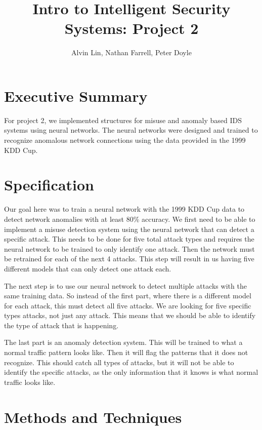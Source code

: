 \documentclass[letterpaper,12pt]{article}
\title{Intro to Intelligent Security Systems: Project 2}
\author{Alvin Lin, Nathan Farrell, Peter Doyle}
\begin{document}
\lstset{basicstyle=\ttfamily\footnotesize,breaklines=true}
\maketitle

\section*{Executive Summary}
For project 2, we implemented structures for misuse and anomaly based IDS
systems using neural networks. The neural networks were designed and trained
to recognize anomalous network connections using the data provided in the 1999
KDD Cup.

\section*{Specification}
Our goal here was to train a neural network with the 1999 KDD Cup data to
detect network anomalies with at least 80\% accuracy. We first need to be able
to implement a misuse detection system using the neural network that can detect
a specific attack. This needs to be done for five total attack types and
requires the neural network to be trained to only identify one attack. Then the
network must be retrained for each of the next 4 attacks. This step will result
in us having five different models that can only detect one attack each. \par
The next step is to use our neural network to detect multiple attacks with the
same training data. So instead of the first part, where there is a different
model for each attack, this must detect all five attacks. We are looking for
five specific types attacks, not just any attack. This means that we should be
able to identify the type of attack that is happening. \par
The last part is an anomaly detection system. This will be trained to what a
normal traffic pattern looks like. Then it will flag the patterns that it does
not recognize. This should catch all types of attacks, but it will not be able
to identify the specific attacks, as the only information that it knows is what
normal traffic looks like.

\section*{Methods and Techniques}
\end{document}
